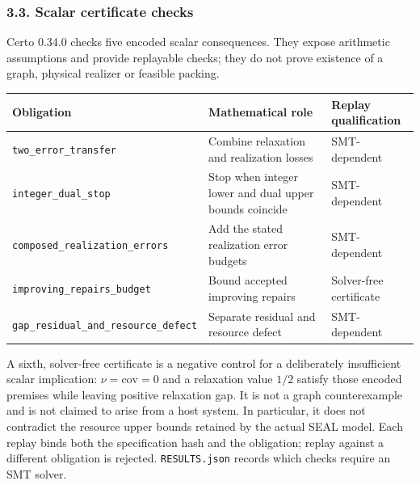 \documentclass[english,11pt,a4paper]{article}
\newcounter{none}
\begin{document}
\subsubsection{3.3. Scalar certificate
checks}\label{scalar-certificate-checks}

Certo 0.34.0 checks five encoded scalar consequences. They expose
arithmetic assumptions and provide replayable checks; they do not prove
existence of a graph, physical realizer or feasible packing.

{\def\LTcaptype{none} %
\begin{longtable}[]{@{}
  >{\raggedright\arraybackslash}p{}
  >{\raggedright\arraybackslash}p{}
  >{\raggedright\arraybackslash}p{}@{}}
\toprule\noalign{}
\begin{minipage}[b]{\linewidth}\raggedright
Obligation
\end{minipage} & \begin{minipage}[b]{\linewidth}\raggedright
Mathematical role
\end{minipage} & \begin{minipage}[b]{\linewidth}\raggedright
Replay qualification
\end{minipage} \\
\midrule\noalign{}
\endhead
\bottomrule\noalign{}
\endlastfoot
\nolinkurl{two_error_transfer} & Combine relaxation and realization
losses & SMT-dependent \\
\nolinkurl{integer_dual_stop} & Stop when integer lower and dual upper
bounds coincide & SMT-dependent \\
\nolinkurl{composed_realization_errors} & Add the stated realization
error budgets & SMT-dependent \\
\nolinkurl{improving_repairs_budget} & Bound accepted improving repairs &
Solver-free certificate \\
\nolinkurl{gap_residual_and_resource_defect} & Separate residual and
resource defect & SMT-dependent \\
\end{longtable}
}

A sixth, solver-free certificate is a negative control for a
deliberately insufficient scalar implication: \(\nu=\mathrm{cov}=0\) and
a relaxation value \(1/2\) satisfy those encoded premises while leaving
positive relaxation gap. It is not a graph counterexample and is not
claimed to arise from a host system. In particular, it does not
contradict the resource upper bounds retained by the actual SEAL model.
Each replay binds both the specification hash and the obligation; replay
against a different obligation is rejected. \texttt{RESULTS.json}
records which checks require an SMT solver.
\end{document}
